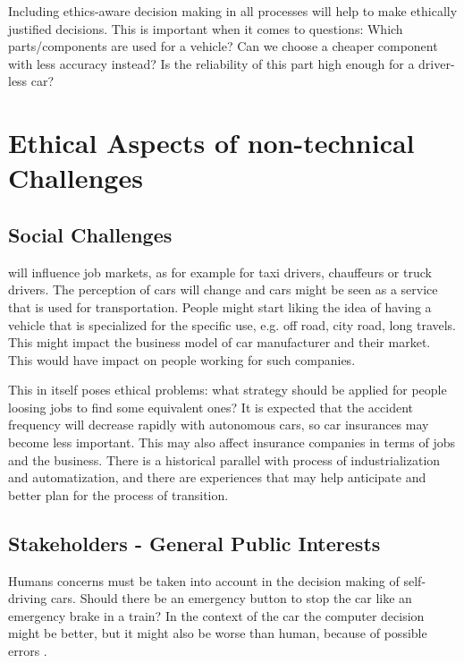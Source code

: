 Including ethics-aware decision making in all processes will help to make ethically justified decisions. This is important when it comes to questions: Which parts/components are used for a vehicle? Can we choose a cheaper component with less accuracy instead? Is the reliability of this part high enough for a driver-less car?



\section{Ethical Aspects of non-technical Challenges}
\label{sec:EAofNONTC}

\subsection{Social Challenges}
\label{sec:EAofNONTC:SocialChallenges}

 will influence job markets, as for example for taxi drivers, chauffeurs or truck drivers. The perception of cars will change and cars might be seen as a service that is used for transportation. People might start liking the idea of having a vehicle that is specialized for the specific use, e.g. off road, city road, long travels. This might impact the business model of car manufacturer and their market. This would have impact on people working for such companies.

This in itself poses ethical problems: what strategy should be applied for people loosing jobs to find some equivalent ones? It is expected that the accident frequency will decrease rapidly with autonomous cars, so car insurances may become less important. This may also affect insurance companies in terms of jobs and the business. There is a historical parallel with process of industrialization and automatization, and there are experiences that may help anticipate and better plan for the process of transition.


\subsection{Stakeholders - General Public Interests}
\label{sec:EAofNONTC:Stakeholders}

Humans concerns must be taken into account in the decision making of self-driving cars. Should there be an emergency button to stop the car like an emergency brake in a train?  In the context of the car the computer decision might be better, but it might also be worse than human, because of possible errors \cite{Eckstein2016}.

